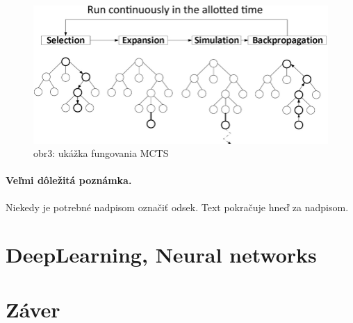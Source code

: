 \documentclass[10pt,twoside,slovak,a4paper]{article}
\begin{document}
\begin{figure}[h]
    \centering
    \includegraphics[width=\textwidth]{MCTS}
    \caption{obr3: ukážka fungovania MCTS}
    \label{obr2}
\end{figure}
\paragraph{Veľmi dôležitá poznámka.}
Niekedy je potrebné nadpisom označiť odsek. Text pokračuje hneď za nadpisom.



\section{DeepLearning, Neural networks} \label{DeepNeural}







\section{Záver} \label{zaver} %






\end{document}
